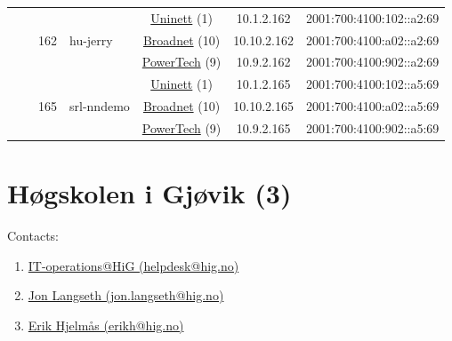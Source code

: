 \begin{small}
\begin{center}
\begin{longtable}{|c|c|c|c|c|c|c|c|}
  &  & \multirow{3}{*}{\tiny{162}} & \multicolumn{1}{|l|}{\multirow{3}{*}{\tiny{hu-jerry}}} & \multicolumn{2}{|c|}{\tiny{\href{https://www.uninett.no}{Uninett} (1)}} & \tiny{10.1.2.162} & \tiny{2001:700:4100:102::a2:69} \\* \cline{5-5}\cline{6-6}\cline{7-7}\cline{8-8}
  &  &  &  & \multicolumn{2}{|c|}{\tiny{\href{https://www.broadnet.no}{Broadnet} (10)}} & \tiny{10.10.2.162} & \tiny{2001:700:4100:a02::a2:69} \\* \cline{5-5}\cline{6-6}\cline{7-7}\cline{8-8}
  &  &  &  & \multicolumn{2}{|c|}{\tiny{\href{http://www.powertech.no}{PowerTech} (9)}} & \tiny{10.9.2.162} & \tiny{2001:700:4100:902::a2:69} \\* \cline{3-3}\cline{4-4}\cline{5-5}\cline{6-6}\cline{7-7}\cline{8-8}
  &  & \multirow{3}{*}{\tiny{165}} & \multicolumn{1}{|l|}{\multirow{3}{*}{\tiny{srl-nndemo}}} & \multicolumn{2}{|c|}{\tiny{\href{https://www.uninett.no}{Uninett} (1)}} & \tiny{10.1.2.165} & \tiny{2001:700:4100:102::a5:69} \\* \cline{5-5}\cline{6-6}\cline{7-7}\cline{8-8}
  &  &  &  & \multicolumn{2}{|c|}{\tiny{\href{https://www.broadnet.no}{Broadnet} (10)}} & \tiny{10.10.2.165} & \tiny{2001:700:4100:a02::a5:69} \\* \cline{5-5}\cline{6-6}\cline{7-7}\cline{8-8}
  &  &  &  & \multicolumn{2}{|c|}{\tiny{\href{http://www.powertech.no}{PowerTech} (9)}} & \tiny{10.9.2.165} & \tiny{2001:700:4100:902::a5:69} \\ \hline
\end{longtable}
\end{center}
\end{small}



\section{Høgskolen i Gjøvik (3)}
\label{sec:HiG}

Contacts:
\begin{enumerate}
 \item {}\href{mailto:helpdesk@hig.no}{IT-operations@HiG (helpdesk@hig.no)}
 \item {}\href{mailto:jon.langseth@hig.no}{Jon Langseth (jon.langseth@hig.no)}
 \item {}\href{mailto:erikh@hig.no}{Erik Hjelmås (erikh@hig.no)}
\end{enumerate}

